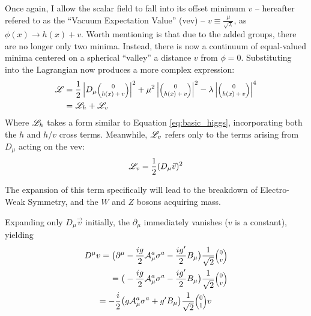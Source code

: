     Once again, I allow the scalar field to fall into its offset minimum $v$ --
        hereafter refered to as the ``Vacuum Expectation Value'' (vev) --
        $v \equiv \frac{\mu}{\sqrt{\lambda}}$, as $\phi(x) \to h(x) + v$.
    Worth mentioning is that due to the added groups, there are no longer only two minima.
    Instead, there is now a continuum of equal-valued minima centered on a spherical ``valley'' a distance $v$ from $\phi=0$.
    Substituting into the Lagrangian now produces a more complex expression:
    \begin{equation} \begin{split}
        \label{eq:fullHiggs}
        \Lag & = \frac{1}{2} \left|D_{\mu} \minimatrix{0\\h(x)+v}\right|^2
            + \mu^2 \left|\minimatrix{0\\h(x)+v}\right|^2
            - \lambda \left|\minimatrix{0\\h(x)+v}\right|^4 \\
         & = \Lag_h + \Lag_v
    \end{split} \end{equation}
    Where $\mathscr{L}_h$ takes a form similar to Equation \ref{eq:basic_higgs}, incorporating both the $h$ and $h$/$v$ cross terms.
    Meanwhile, $\mathscr{L}_v$ refers only to the terms arising from $D_{\mu}$ acting on the vev:
    \begin{equation}
        \label{eq:lagv}
        \mathscr{L}_v = \frac{1}{2} (D_{\mu} \vec{v})^2
    \end{equation}

    The expansion of this term specifically will lead to the breakdown of Electro-Weak Symmetry,
        and the $W$ and $Z$ bosons acquiring mass.

    Expanding only $D_{\mu} \vec{v}$ initially, the $\partial_{\mu}$ immediately vanishes ($v$ is a constant), yielding 
    \begin{equation} \begin{split}
        D^{\mu} v  = \big( \partial^{\mu} & - \frac{ig}{2} \wField^a_{\mu} \sigma^a - \frac{ig'}{2} B_{\mu} \big) \frac{1}{\sqrt{2}}\minimatrix{0\\v} \\
        = \big( & - \frac{ig}{2} \wField^a_{\mu} \sigma^a - \frac{ig'}{2} B_{\mu} \big) \frac{1}{\sqrt{2}}\minimatrix{0\\v} \\
        = - \frac{i}{2} \big( & g \wField^a_{\mu} \sigma^a + g' B_{\mu} \big) \frac{1}{\sqrt{2}}\minimatrix{0\\1} v
    \end{split} \end{equation}

